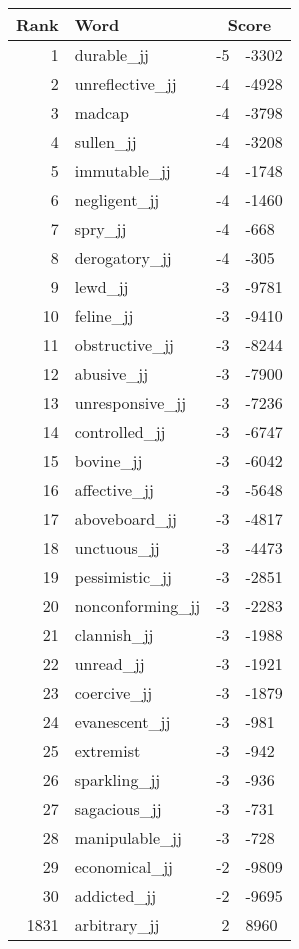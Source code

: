 \begin{longtable}[!htbp]{| rlr@{.}l |}
    \hline
    \textbf{Rank} & \textbf{Word} & \multicolumn{2}{c|}{\textbf{Score}} \\
    \hline
    \endhead
    1 & durable\_jj & -5 & -3302 \\
    2 & unreflective\_jj & -4 & -4928 \\
    3 & madcap & -4 & -3798 \\
    4 & sullen\_jj & -4 & -3208 \\
    5 & immutable\_jj & -4 & -1748 \\
    6 & negligent\_jj & -4 & -1460 \\
    7 & spry\_jj & -4 & -668 \\
    8 & derogatory\_jj & -4 & -305 \\
    9 & lewd\_jj & -3 & -9781 \\
    10 & feline\_jj & -3 & -9410 \\
    11 & obstructive\_jj & -3 & -8244 \\
    12 & abusive\_jj & -3 & -7900 \\
    13 & unresponsive\_jj & -3 & -7236 \\
    14 & controlled\_jj & -3 & -6747 \\
    15 & bovine\_jj & -3 & -6042 \\
    16 & affective\_jj & -3 & -5648 \\
    17 & aboveboard\_jj & -3 & -4817 \\
    18 & unctuous\_jj & -3 & -4473 \\
    19 & pessimistic\_jj & -3 & -2851 \\
    20 & nonconforming\_jj & -3 & -2283 \\
    21 & clannish\_jj & -3 & -1988 \\
    22 & unread\_jj & -3 & -1921 \\
    23 & coercive\_jj & -3 & -1879 \\
    24 & evanescent\_jj & -3 & -981 \\
    25 & extremist & -3 & -942 \\
    26 & sparkling\_jj & -3 & -936 \\
    27 & sagacious\_jj & -3 & -731 \\
    28 & manipulable\_jj & -3 & -728 \\
    29 & economical\_jj & -2 & -9809 \\
    30 & addicted\_jj & -2 & -9695 \\
    1831 & arbitrary\_jj & 2 & 8960 \\

\end{longtable}
